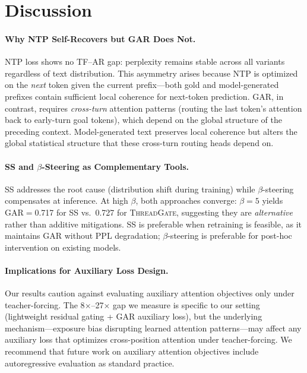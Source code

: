 \documentclass[11pt]{article}
\newcommand{\gar}{\textsc{GAR}}
\newcommand{\tg}{\textsc{ThreadGate}}
\begin{document}
\section{Discussion}

\paragraph{Why NTP Self-Recovers but GAR Does Not.}
NTP loss shows no TF--AR gap: perplexity remains stable across all variants regardless of text distribution. This asymmetry arises because NTP is optimized on the \emph{next} token given the current prefix---both gold and model-generated prefixes contain sufficient local coherence for next-token prediction. \gar{}, in contrast, requires \emph{cross-turn} attention patterns (routing the last token's attention back to early-turn goal tokens), which depend on the global structure of the preceding context. Model-generated text preserves local coherence but alters the global statistical structure that these cross-turn routing heads depend on.

\paragraph{SS and $\beta$-Steering as Complementary Tools.}
SS addresses the root cause (distribution shift during training) while $\beta$-steering compensates at inference. At high $\beta$, both approaches converge: $\beta=5$ yields \gar{}$=$0.717 for SS vs.\ 0.727 for \tg{}, suggesting they are \emph{alternative} rather than additive mitigations. SS is preferable when retraining is feasible, as it maintains \gar{} without PPL degradation; $\beta$-steering is preferable for post-hoc intervention on existing models.

\paragraph{Implications for Auxiliary Loss Design.}
Our results caution against evaluating auxiliary attention objectives only under teacher-forcing. The 8$\times$--27$\times$ gap we measure is specific to our setting (lightweight residual gating + \gar{} auxiliary loss), but the underlying mechanism---exposure bias disrupting learned attention patterns---may affect any auxiliary loss that optimizes cross-position attention under teacher-forcing. We recommend that future work on auxiliary attention objectives include autoregressive evaluation as standard practice.
\end{document}
